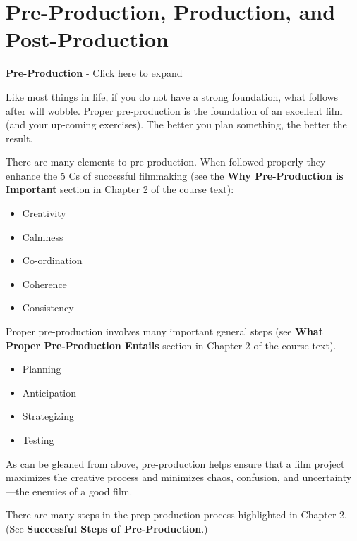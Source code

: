 \documentclass[
]{book}
\providecommand{\tightlist}{%
  \setlength{\itemsep}{0pt}\setlength{\parskip}{0pt}}
\begin{document}
\hypertarget{pre-production-production-and-post-production}{%
\section{Pre-Production, Production, and Post-Production}\label{pre-production-production-and-post-production}}

\textbf{Pre-Production} - Click here to expand

Like most things in life, if you do not have a strong foundation, what follows after will wobble. Proper pre-production is the foundation of an excellent film (and your up-coming exercises). The better you plan something, the better the result.

There are many elements to pre-production. When followed properly they enhance the 5 Cs of successful filmmaking (see the \textbf{Why Pre-Production is Important} section in Chapter 2 of the course text):

\begin{itemize}
\tightlist
\item
  Creativity\\
\item
  Calmness\\
\item
  Co-ordination\\
\item
  Coherence\\
\item
  Consistency
\end{itemize}

Proper pre-production involves many important general steps (see \textbf{What Proper Pre-Production Entails} section in Chapter 2 of the course text).

\begin{itemize}
\tightlist
\item
  Planning\\
\item
  Anticipation\\
\item
  Strategizing\\
\item
  Testing
\end{itemize}

As can be gleaned from above, pre-production helps ensure that a film project maximizes the creative process and minimizes chaos, confusion, and uncertainty---the enemies of a good film.

There are many steps in the prep-production process highlighted in Chapter 2. (See \textbf{Successful Steps of Pre-Production}.)
\end{document}
